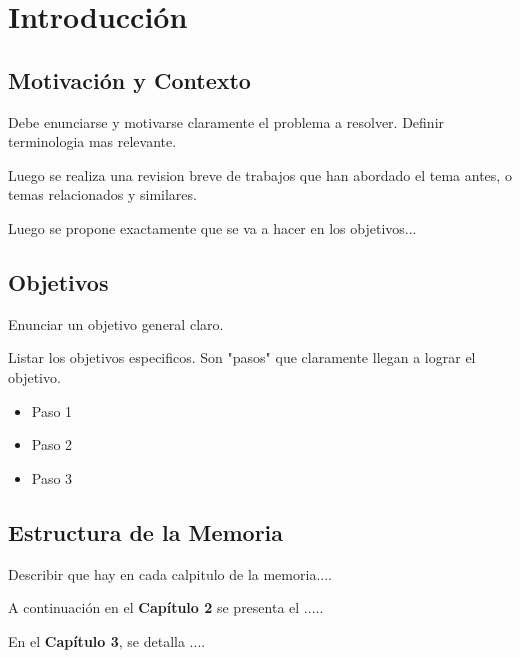 \chapter{Introducción}
\label{c1} %

\section{Motivación y Contexto}

Debe enunciarse y motivarse claramente el problema a resolver. Definir terminologia mas relevante. 

Luego se realiza una revision breve de trabajos que han abordado el tema antes, o temas relacionados y similares. 

Luego se propone exactamente que se va a hacer en los objetivos...

\section{Objetivos}

Enunciar un objetivo general claro. 

Listar los objetivos especificos. Son "pasos" que claramente llegan a lograr el objetivo. 

\begin{itemize}
  \item Paso 1
  \item Paso 2
  \item Paso 3
\end{itemize}

\section{Estructura de la Memoria}

Describir que hay en cada calpitulo de la memoria.... 

A continuación en el \textbf{Capítulo 2} se presenta el .....


En el \textbf{Capítulo 3}, se detalla ....
